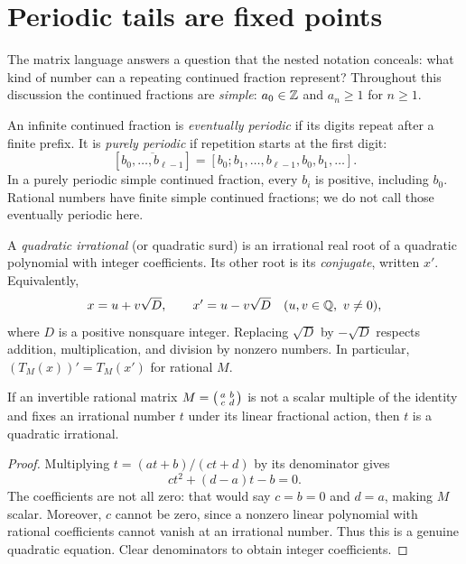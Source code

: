 \section{Periodic tails are fixed points}
\label{sec:periodic-fixed-points}

The matrix language answers a question that the nested notation conceals:
what kind of number can a repeating continued fraction represent?
Throughout this discussion the continued fractions are \emph{simple}:
$a_0\in\mathbb Z$ and $a_n\ge1$ for $n\ge1$.

\begin{definition}
An infinite continued fraction is \emph{eventually periodic} if its digits
repeat after a finite prefix. It is \emph{purely periodic} if repetition
starts at the first digit:
\[
 [\overline{b_0,\ldots,b_{\ell-1}}]
 =[b_0;b_1,\ldots,b_{\ell-1},b_0,b_1,\ldots].
\]
In a purely periodic simple continued fraction, every $b_i$ is positive,
including $b_0$. Rational numbers have finite simple continued fractions;
we do not call those eventually periodic here.
\end{definition}

\begin{definition}
A \emph{quadratic irrational} (or quadratic surd) is an irrational real
root of a quadratic polynomial with integer coefficients. Its other root
is its \emph{conjugate}, written $x'$. Equivalently,
\[
 x=u+v\sqrt D,\qquad x'=u-v\sqrt D
 \quad (u,v\in\mathbb Q,\ v\ne0),
\]
where $D$ is a positive nonsquare integer. Replacing $\sqrt D$ by
$-\sqrt D$ respects addition, multiplication, and division by nonzero
numbers. In particular, $(T_M(x))'=T_M(x')$ for rational $M$.
\end{definition}

\begin{lemma}
\label{lem:mobius-fixed-point}
If an invertible rational matrix
$M=\begin{psmallmatrix}a&b\\c&d\end{psmallmatrix}$ is not a scalar
multiple of the identity and fixes an irrational number $t$ under its
linear fractional action, then $t$ is a quadratic irrational.
\end{lemma}
\begin{proof}
Multiplying $t=(at+b)/(ct+d)$ by its denominator gives
\begin{equation}\label{eq:mobius-fixed-point}
 ct^2+(d-a)t-b=0.
\end{equation}
The coefficients are not all zero: that would say $c=b=0$ and $d=a$,
making $M$ scalar. Moreover, $c$ cannot be zero, since a nonzero linear
polynomial with rational coefficients cannot vanish at an irrational
number. Thus this is a genuine quadratic equation. Clear denominators to
obtain integer coefficients.
\end{proof}

